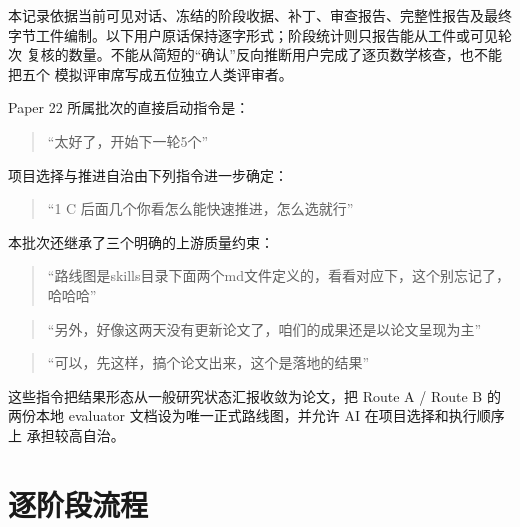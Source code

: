 \documentclass[12pt,a4paper]{article}
\begin{document}
本记录依据当前可见对话、冻结的阶段收据、补丁、审查报告、完整性报告及最终
字节工件编制。以下用户原话保持逐字形式；阶段统计则只报告能从工件或可见轮次
复核的数量。不能从简短的``确认''反向推断用户完成了逐页数学核查，也不能把五个
模拟评审席写成五位独立人类评审者。

Paper 22 所属批次的直接启动指令是：

\begin{quote}
``太好了，开始下一轮5个''
\end{quote}

项目选择与推进自治由下列指令进一步确定：

\begin{quote}
``1 C 后面几个你看怎么能快速推进，怎么选就行''
\end{quote}

本批次还继承了三个明确的上游质量约束：

\begin{quote}
``路线图是skills目录下面两个md文件定义的，看看对应下，这个别忘记了，哈哈哈''
\end{quote}

\begin{quote}
``另外，好像这两天没有更新论文了，咱们的成果还是以论文呈现为主''
\end{quote}

\begin{quote}
``可以，先这样，搞个论文出来，这个是落地的结果''
\end{quote}

这些指令把结果形态从一般研究状态汇报收敛为论文，把 Route A / Route B 的
两份本地 evaluator 文档设为唯一正式路线图，并允许 AI
在项目选择和执行顺序上 承担较高自治。

\hypertarget{ux9010ux9636ux6bb5ux6d41ux7a0b}{%
\section{逐阶段流程}\label{ux9010ux9636ux6bb5ux6d41ux7a0b}}
\end{document}
